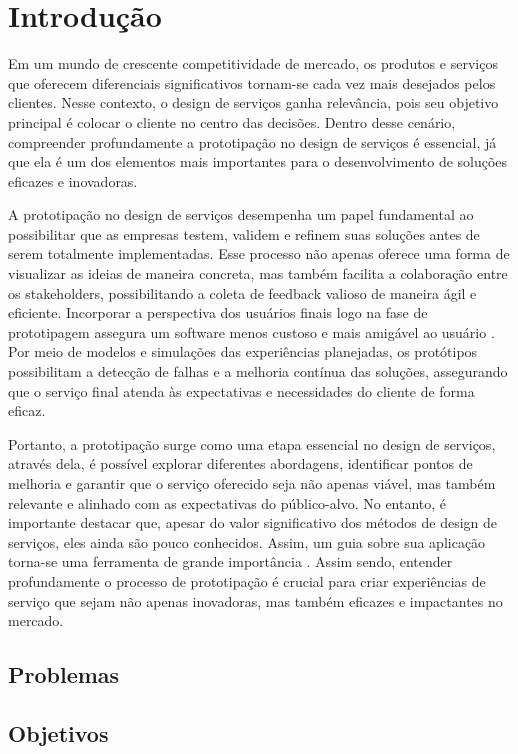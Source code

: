 \chapter[Introdução]{Introdução}


Em um mundo de crescente competitividade de mercado, os produtos e serviços que oferecem diferenciais significativos tornam-se cada vez mais desejados pelos clientes. Nesse contexto, o design de serviços ganha relevância, pois seu objetivo principal é colocar o cliente no centro das decisões. Dentro desse cenário, compreender profundamente a prototipação no design de serviços é essencial, já que ela é um dos elementos mais importantes para o desenvolvimento de soluções eficazes e inovadoras.

A prototipação no design de serviços desempenha um papel fundamental ao possibilitar que as empresas testem, validem e refinem suas soluções antes de serem totalmente implementadas. Esse processo não apenas oferece uma forma de visualizar as ideias de maneira concreta, mas também facilita a colaboração entre os stakeholders, possibilitando a coleta de feedback valioso de maneira ágil e eficiente. Incorporar a perspectiva dos usuários finais logo na fase de prototipagem assegura um software menos custoso e mais amigável ao usuário \cite{Mattjus2023}. Por meio de modelos e simulações das experiências planejadas, os protótipos possibilitam a detecção de falhas e a melhoria contínua das soluções, assegurando que o serviço final atenda às expectativas e necessidades do cliente de forma eficaz.

Portanto, a prototipação surge como uma etapa essencial no design de serviços, através dela, é possível explorar diferentes abordagens, identificar pontos de melhoria e garantir que o serviço oferecido seja não apenas viável, mas também relevante e alinhado com as expectativas do público-alvo.  No entanto, é importante destacar que, apesar do valor significativo dos métodos de design de serviços, eles ainda são pouco conhecidos. Assim, um guia sobre sua aplicação torna-se uma ferramenta de grande importância \cite{Mattjus2023}. Assim sendo, entender profundamente o processo de prototipação é crucial para criar experiências de serviço que sejam não apenas inovadoras, mas também eficazes e impactantes no mercado.


\section {Problemas}

\section {Objetivos}
